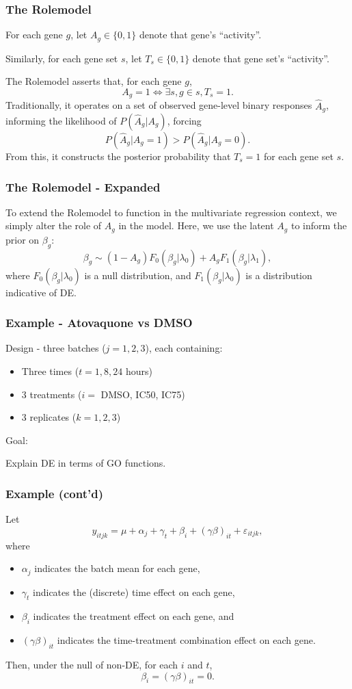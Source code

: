 \documentclass{beamer}
\begin{document}
\begin{frame}
  \frametitle{The Rolemodel}

  For each gene $g$, let $A_g \in \{0, 1\}$ denote that gene's ``activity''.

  Similarly, for each gene set $s$, let $T_s \in \{0,1\}$ denote that gene set's ``activity''.

  \vfill

  The Rolemodel asserts that, for each gene $g$, \[A_g = 1 \iff \exists s, g\in s, T_s = 1.\]
  Traditionally, it operates on a set of observed gene-level binary responses $\hat A_g$, informing the likelihood of $P(\hat A_g | A_g)$, forcing \[P(\hat A_g | A_g = 1) > P(\hat A_g | A_g = 0).\]
  From this, it constructs the posterior probability that $T_s = 1$ for each gene set $s$.
\end{frame}

\begin{frame}
  \frametitle{The Rolemodel - Expanded}
  To extend the Rolemodel to function in the multivariate regression context, we simply alter the role of $A_g$ in the model.
  Here, we use the latent $A_g$ to inform the prior on $\beta_g$: 
  \[
    \beta_g \sim (1 - A_g) F_0(\beta_g | \lambda_0 ) + A_g F_1(\beta_g | \lambda_1 ),
  \]
  where $F_0(\beta_g | \lambda_0)$ is a null distribution, and $F_1(\beta_g | \lambda_0)$ is a distribution indicative of DE. 

\end{frame}

\begin{frame}
  \frametitle{Example - Atovaquone vs DMSO}
  Design - three batches ($j = 1,2,3$), each containing: 
  \begin{itemize}
    \item Three times ($t = 1, 8, 24$ hours)
    \item 3 treatments ($i =$ DMSO, IC50, IC75)
    \item 3 replicates ($k = 1,2,3$)
  \end{itemize}
  Goal: 
  \begin{center} Explain DE in terms of GO functions. \end{center}
\end{frame}

\begin{frame}
  \frametitle{Example (cont'd)}
  Let 
  \[
    y_{itjk} = \mu + \alpha_{j} + \gamma_{t} + \beta_{i} + (\gamma\beta)_{it} + \varepsilon_{itjk}, 
  \]
  where 
  \begin{itemize}
    \item $\alpha_j$ indicates the batch mean for each gene,
    \item $\gamma_t$ indicates the (discrete) time effect on each gene,
    \item $\beta_i$ indicates the treatment effect on each gene, and 
    \item $(\gamma\beta)_{it}$ indicates the time-treatment combination effect on each gene.
  \end{itemize}

  Then, under the null of non-DE, for each $i$ and $t$,
  \[
    \beta_i = (\gamma\beta)_{it} = 0.
  \]
\end{frame}
\end{document}
